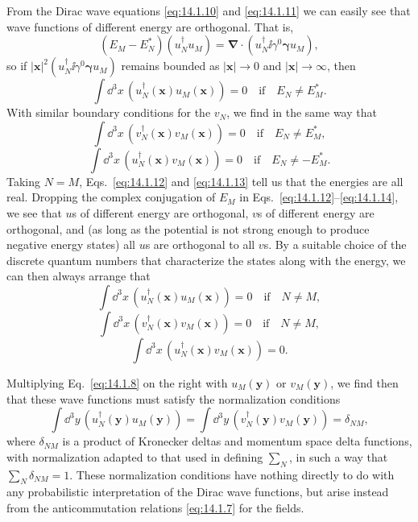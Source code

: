 From the Dirac wave equations \eqref{eq:14.1.10} and \eqref{eq:14.1.11} we can
easily see that wave functions of different energy are orthogonal. That is,
\[
  (E_M-E_N^*)(u_N^\dagger u_M)
  =\boldsymbol\nabla\cdot(u_N^\dagger \ii\gamma^0\boldsymbol\gamma u_M),
\]
so if $|\mathbf x|^2(u_N^\dagger \ii\gamma^0\boldsymbol\gamma u_M)$ remains
bounded as $|\mathbf x|\to0$ and $|\mathbf x|\to\infty$, then
\begin{equation}
  \int \dd^3x\,(u_N^\dagger(\mathbf x)u_M(\mathbf x))=0
  \quad\text{if}\quad E_N\ne E_M^*.
  \tag{14.1.12}\label{eq:14.1.12}
\end{equation}
With similar boundary conditions for the $v_N$, we find in the same way that
\begin{equation}
  \int \dd^3x\,(v_N^\dagger(\mathbf x)v_M(\mathbf x))=0
  \quad\text{if}\quad E_N\ne E_M^*,
  \tag{14.1.13}\label{eq:14.1.13}
\end{equation}
\begin{equation}
  \int \dd^3x\,(u_N^\dagger(\mathbf x)v_M(\mathbf x))=0
  \quad\text{if}\quad E_N\ne-E_M^*.
  \tag{14.1.14}\label{eq:14.1.14}
\end{equation}
Taking $N=M$, Eqs.~\eqref{eq:14.1.12} and \eqref{eq:14.1.13} tell us that the
energies are all real. Dropping the complex conjugation of $E_M$ in
Eqs.~\eqref{eq:14.1.12}--\eqref{eq:14.1.14}, we see that $u$s of different
energy are orthogonal, $v$s of different energy are orthogonal, and (as long
as the potential is not strong enough to produce negative energy states) all
$u$s are orthogonal to all $v$s. By a suitable choice of the discrete quantum
numbers that characterize the states along with the energy, we can then always
arrange that
\begin{equation}
  \int \dd^3x\,(u_N^\dagger(\mathbf x)u_M(\mathbf x))=0\quad\text{if}\quad N\ne M,
  \tag{14.1.15}\label{eq:14.1.15}
\end{equation}
\begin{equation}
  \int \dd^3x\,(v_N^\dagger(\mathbf x)v_M(\mathbf x))=0\quad\text{if}\quad N\ne M,
  \tag{14.1.16}\label{eq:14.1.16}
\end{equation}
\begin{equation}
  \int \dd^3x\,(u_N^\dagger(\mathbf x)v_M(\mathbf x))=0.
  \tag{14.1.17}\label{eq:14.1.17}
\end{equation}

Multiplying Eq.~\eqref{eq:14.1.8} on the right with $u_M(\mathbf y)$ or
$v_M(\mathbf y)$, we find then that these wave functions must satisfy the
normalization conditions
\begin{equation}
  \int \dd^3y\,(u_N^\dagger(\mathbf y)u_M(\mathbf y))
  =\int \dd^3y\,(v_N^\dagger(\mathbf y)v_M(\mathbf y))=\delta_{NM},
  \tag{14.1.18}\label{eq:14.1.18}
\end{equation}
where $\delta_{NM}$ is a product of Kronecker deltas and momentum space delta
functions, with normalization adapted to that used in defining $\sum_N$, in
such a way that $\sum_N\delta_{NM}=1$. These normalization conditions have
nothing directly to do with any probabilistic interpretation of the Dirac wave
functions, but arise instead from the anticommutation relations
\eqref{eq:14.1.7} for the fields.

